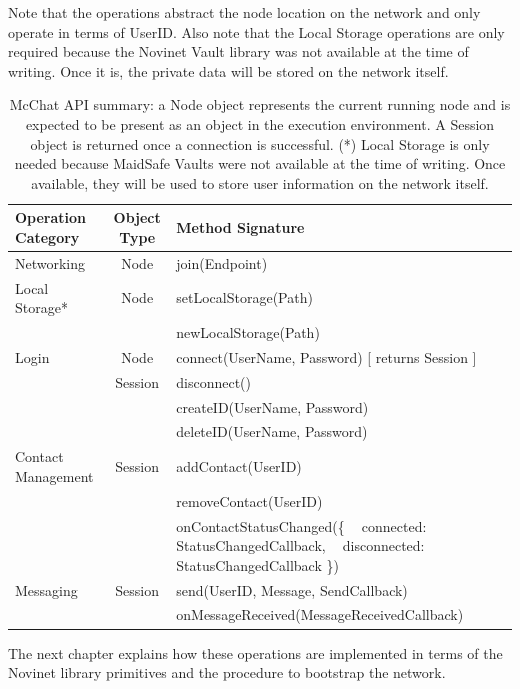 Note that the operations abstract the node location on the network and only operate in terms of UserID. Also note that the Local Storage operations are only required because the Novinet Vault library was not available at the time of writing. Once it is, the private data will be stored on the network itself.

\begin{table}
\centering
\begin{tabular}{|l|c|l|p{8cm}|}
\hline
\textbf{Operation Category} & \textbf{Object Type} & \textbf{Method Signature}\\ 
\hline
Networking & Node & join(Endpoint)\\ 
\hline
Local Storage* & Node & setLocalStorage(Path)\\ 
 &  & newLocalStorage(Path)\\ 
\hline
Login & Node & connect(UserName, Password) [ returns Session ]\\ 
 & Session & disconnect()\\ 
 &  & createID(UserName, Password)\\ 
 &  & deleteID(UserName, Password)\\ 
\hline
Contact Management & Session & addContact(UserID)\\ 
 & & removeContact(UserID)\\ 
 & & \parbox{8cm}{onContactStatusChanged(\{ \\
 $~~~~$connected: StatusChangedCallback,\\
 $~~~~$disconnected: StatusChangedCallback \\
\})}\\ 
\hline
Messaging & Session & send(UserID, Message, SendCallback)\\ 
 &  & onMessageReceived(MessageReceivedCallback)\\ 
\hline\end{tabular}
\label{table:McChatAPI}
\caption[McChat API Summary]{McChat API summary: a Node object represents the current running node and is expected to be present as an object in the execution environment. A Session object is returned once a connection is successful. (*) Local Storage is only needed because MaidSafe Vaults were not available at the time of writing. Once available, they will be used to store user information on the network itself.}
\end{table}

The next chapter explains how these operations are implemented in terms of the Novinet library primitives and the procedure to bootstrap the network.
